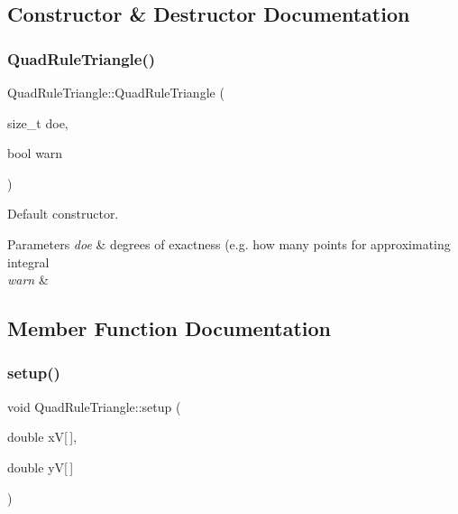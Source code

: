 \subsection{Constructor \& Destructor Documentation}
\mbox{\label{classHArDCore2D_1_1QuadRuleTriangle_a83a432b56c03fffa615ec85f5dfd57d7}} 
\subsubsection{\texorpdfstring{Quad\+Rule\+Triangle()}{QuadRuleTriangle()}}
{\footnotesize\ttfamily Quad\+Rule\+Triangle\+::\+Quad\+Rule\+Triangle (\begin{DoxyParamCaption}\item[{size\+\_\+t}]{doe,  }\item[{bool}]{warn }\end{DoxyParamCaption})}



Default constructor. 


\begin{DoxyParams}{Parameters}
{\em doe} & degrees of exactness (e.\+g. how many points for approximating integral \\
\hline
{\em warn} & \\
\hline
\end{DoxyParams}


\subsection{Member Function Documentation}
\mbox{\label{classHArDCore2D_1_1QuadRuleTriangle_aa2cd3081837b1cb46f6573ceb16de7b2}} 
\subsubsection{\texorpdfstring{setup()}{setup()}}
{\footnotesize\ttfamily void Quad\+Rule\+Triangle\+::setup (\begin{DoxyParamCaption}\item[{double}]{xV\mbox{[}$\,$\mbox{]},  }\item[{double}]{yV\mbox{[}$\,$\mbox{]} }\end{DoxyParamCaption})}



